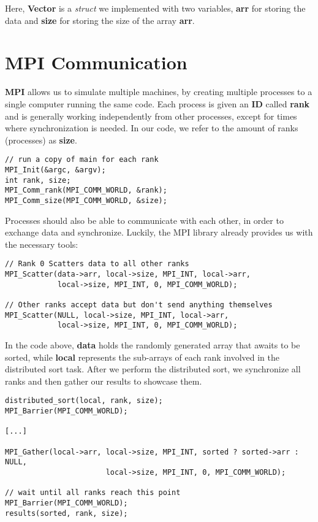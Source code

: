 \documentclass[12pt]{report}
\begin{document}
Here, \textbf{Vector} is a \textit{struct} we implemented with two variables, \textbf{arr} for storing the data and \textbf{size} for storing the size of the array \textbf{arr}. \newpage

\section{MPI Communication}
\textbf{MPI}  allows us to simulate multiple machines, by creating multiple processes to a single computer running the same code. Each process is given an \textbf{ID} called \textbf{rank} and is generally working independently from other processes, except for times where synchronization is needed. In our code, we refer to the amount of ranks (processes) as \textbf{size}.

\begin{lstlisting}[style=cstyle]
// run a copy of main for each rank
MPI_Init(&argc, &argv);
int rank, size;
MPI_Comm_rank(MPI_COMM_WORLD, &rank);
MPI_Comm_size(MPI_COMM_WORLD, &size);
\end{lstlisting}

Processes should also be able to communicate with each other, in order to exchange data and synchronize. Luckily, the MPI library already provides us with the necessary tools:
\begin{lstlisting}[style=cstyle]
// Rank 0 Scatters data to all other ranks
MPI_Scatter(data->arr, local->size, MPI_INT, local->arr,
            local->size, MPI_INT, 0, MPI_COMM_WORLD);

// Other ranks accept data but don't send anything themselves
MPI_Scatter(NULL, local->size, MPI_INT, local->arr, 
            local->size, MPI_INT, 0, MPI_COMM_WORLD);
\end{lstlisting}

In the code above, \textbf{data} holds the randomly generated array that awaits to be sorted, while \textbf{local} represents the sub-arrays of each rank involved in the distributed sort task. 
After we perform the distributed sort, we synchronize all ranks and then gather our results to showcase them.

\begin{lstlisting}[style=cstyle]
distributed_sort(local, rank, size);
MPI_Barrier(MPI_COMM_WORLD);

[...]

MPI_Gather(local->arr, local->size, MPI_INT, sorted ? sorted->arr : NULL, 
                       local->size, MPI_INT, 0, MPI_COMM_WORLD);

// wait until all ranks reach this point
MPI_Barrier(MPI_COMM_WORLD);
results(sorted, rank, size);
\end{lstlisting}
\newpage
\end{document}
